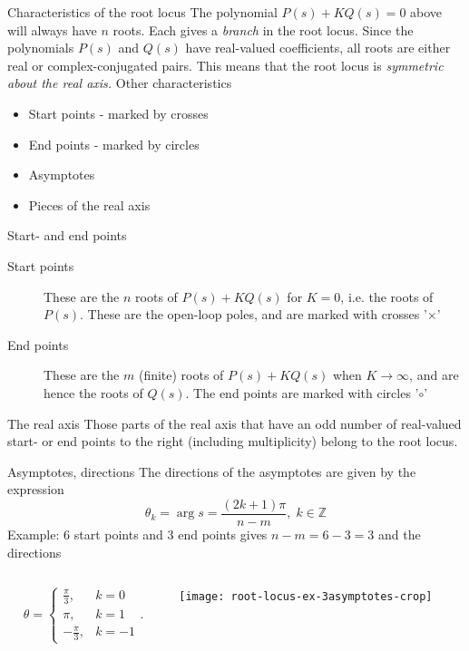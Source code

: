 \documentclass[presentation,aspectratio=169, usenames, dvipsnames]{beamer}
\begin{document}
\begin{frame}[label={sec:org0e0fe88}]{Characteristics of the root locus}
The polynomial \(P(s)+KQ(s)=0\) above will always have \(n\) roots. Each gives a \emph{branch} in the root locus. Since the polynomials \(P(s)\) and \(Q(s)\) have real-valued coefficients, all roots are either real or complex-conjugated pairs. This means that the root locus is \emph{symmetric about the real axis.} Other characteristics
\begin{itemize}
\item Start points - marked by crosses
\item End points - marked  by circles
\item Asymptotes
\item Pieces of the real axis
\end{itemize}
\end{frame}

\begin{frame}[label={sec:org2badeee}]{Start- and end points}
\begin{description}
\item[{Start points}] These are the \(n\) roots of \(P(s) + KQ(s)\) for \(K=0\), i.e. the roots of \(P(s)\). These are the open-loop poles, and are marked with crosses '\(\times\)'
\item[{End points}] These are the \(m\) (finite) roots of \(P(s)+KQ(s)\) when \(K\to\infty\), and are hence the roots of \(Q(s)\). The end points are marked with circles '\(\circ\)'
\end{description}
\end{frame}

\begin{frame}[label={sec:orge098737}]{The real axis}
Those parts of the real axis that have an \alert{odd number} of real-valued start- or end points to the right (including multiplicity) belong to the root locus. 
\end{frame}


\begin{frame}[label={sec:orgb804572}]{Asymptotes, directions}
The directions of the asymptotes are given by the expression
\[ \theta_k = \arg s = \frac{(2k+1)\pi}{n-m}, \; k \in \mathbb{Z} \]
Example: 6 start points and 3 end points gives \(n-m = 6-3 = 3\) and the directions

\begin{columns}
\begin{column}{0.35\columnwidth}
\[ \theta = \begin{cases} \frac{\pi}{3}, & k=0\\ \pi, & k=1\\ -\frac{\pi}{3}, & k=-1 \end{cases}. \]
\end{column}

\begin{column}{0.65\columnwidth}
\begin{center}
\texttt{[image: root-locus-ex-3asymptotes-crop]}
\end{center}
\end{column}
\end{columns}
\end{frame}
\end{document}
